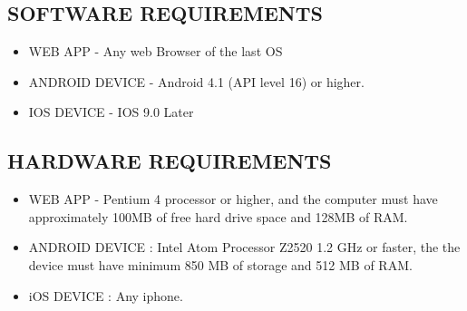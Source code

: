 \documentclass[12pt]{article}
\begin{document}
\begin{enumerate}
\subsection{SOFTWARE REQUIREMENTS}

\begin{itemize}
\item  WEB APP - Any web Browser of the last OS
\item  ANDROID DEVICE - Android 4.1 (API level 16) or higher.
\item  IOS DEVICE - IOS 9.0 Later
\end{itemize}
\vspace{10px}
       
\subsection{HARDWARE REQUIREMENTS}

\begin{itemize}
\item WEB APP - Pentium 4 processor or higher, and the computer must have approximately 100MB of free hard drive space and 128MB of RAM.

\item ANDROID DEVICE :  Intel Atom Processor Z2520 1.2 GHz or faster, the the device must have minimum 850 MB of storage and 512 MB of RAM. 
          
\item iOS DEVICE : Any iphone.

\end{itemize}
\vspace{10px}


\end{enumerate}
\end{document}
